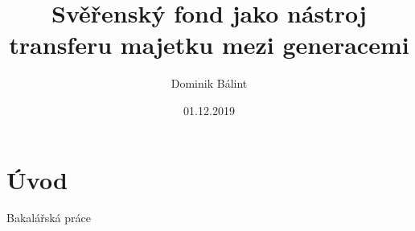 \documentclass{article}
\title{Svěřenský fond jako nástroj transferu majetku mezi generacemi}
\author{Dominik Bálint}
\date{01.12.2019}
\begin{document}
  \maketitle
  \newpage
  \tableofcontents
  \newpage
  
\section{Úvod} 

Bakalářská práce
	
\end{document}
